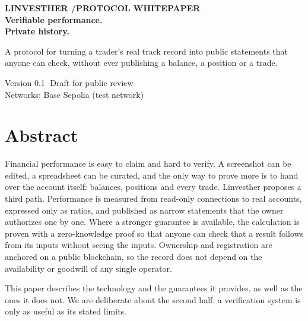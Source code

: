 \documentclass[11pt,a4paper]{article}
\begin{document}
\thispagestyle{empty}
\begin{flushleft}
\color{lime}\sffamily
\vspace*{3.4cm}
{\footnotesize\bfseries\MakeUppercase{Linvesther \quad/\quad Protocol whitepaper}}\\[2.2cm]
{\fontsize{34}{38}\selectfont\bfseries Verifiable performance.\\[0.15em]Private history.}\\[1.4cm]
{\color{paper}\large\begin{minipage}{0.78\textwidth}
A protocol for turning a trader's real track record into public statements that anyone can check, without ever publishing a balance, a position or a trade.
\end{minipage}}
\vfill
{\color{paper!70!ink}\footnotesize Version 0.1 \quad$\cdot$\quad Draft for public review\\
Networks: Base Sepolia (test network)}
\vspace*{0.8cm}
\end{flushleft}
\newpage

\section*{Abstract}
Financial performance is easy to claim and hard to verify. A screenshot can be edited, a spreadsheet can be curated, and the only way to prove more is to hand over the account itself: balances, positions and every trade. Linvesther proposes a third path. Performance is measured from read-only connections to real accounts, expressed only as ratios, and published as narrow statements that the owner authorizes one by one. Where a stronger guarantee is available, the calculation is proven with a zero-knowledge proof so that anyone can check that a result follows from its inputs without seeing the inputs. Ownership and registration are anchored on a public blockchain, so the record does not depend on the availability or goodwill of any single operator.

This paper describes the technology and the guarantees it provides, as well as the ones it does not. We are deliberate about the second half: a verification system is only as useful as its stated limits.
\end{document}
